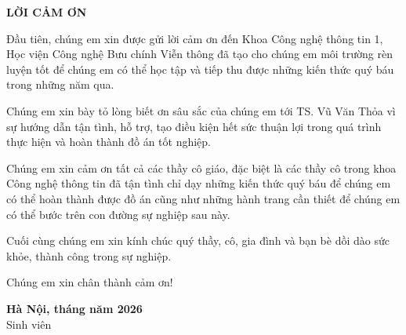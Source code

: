 \documentclass[../main.tex]{subfiles}
\begin{document}
\markboth{}{}
\begin{center}
    {\large \textbf{LỜI CẢM ƠN}}
\end{center}
\vspace{0.5cm}

Đầu tiên, chúng em xin được gửi lời cảm ơn đến Khoa Công nghệ thông tin 1, Học viện Công nghệ Bưu chính Viễn thông đã tạo cho chúng em môi trường rèn luyện tốt để chúng em có thể học tập và tiếp thu được những kiến thức quý báu trong những năm qua.

Chúng em xin bày tỏ lòng biết ơn sâu sắc của chúng em tới TS. Vũ Văn Thỏa vì sự hướng dẫn tận tình, hỗ trợ, tạo điều kiện hết sức thuận lợi trong quá trình thực hiện và hoàn thành đồ án tốt nghiệp.

Chúng em xin cảm ơn tất cả các thầy cô giáo, đặc biệt là các thầy cô trong khoa Công nghệ thông tin đã tận tình chỉ dạy những kiến thức quý báu để chúng em có thể hoàn thành được đồ án cũng như những hành trang cần thiết để chúng em có thể bước trên con đường sự nghiệp sau này.

Cuối cùng chúng em xin kính chúc quý thầy, cô, gia đình và bạn bè dồi dào sức khỏe, thành công trong sự nghiệp.

Chúng em xin chân thành cảm ơn!

\vspace{1cm}
\begin{flushright}
\begin{minipage}{6.5cm}
\centering
\textbf{Hà Nội, tháng \hspace{0.8cm} năm 2026}\\
Sinh viên
\end{minipage}
\end{flushright}

\newcommand{\mydotfill}{\leavevmode\leaders\hbox to 0.32em{\hss.\hss}\hfill\kern0pt}
\end{document}
